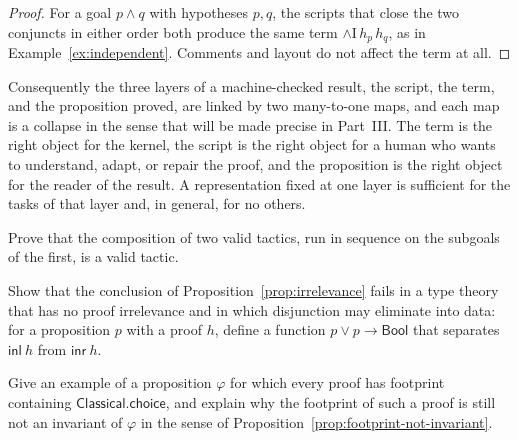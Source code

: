 \begin{proof}
For a goal $p\wedge q$ with hypotheses $p,q$, the scripts that close the two conjuncts in either order both produce the same term $\wedge\mathrm{I}\,h_p\,h_q$, as in Example~\ref{ex:independent}. Comments and layout do not affect the term at all.
\end{proof}

Consequently the three layers of a machine-checked result, the script, the term, and the proposition proved, are linked by two many-to-one maps, and each map is a collapse in the sense that will be made precise in Part~III. The term is the right object for the kernel, the script is the right object for a human who wants to understand, adapt, or repair the proof, and the proposition is the right object for the reader of the result. A representation fixed at one layer is sufficient for the tasks of that layer and, in general, for no others.

\begin{exercise}
Prove that the composition of two valid tactics, run in sequence on the subgoals of the first, is a valid tactic.
\end{exercise}

\begin{exercise}
Show that the conclusion of Proposition~\ref{prop:irrelevance} fails in a type theory that has no proof irrelevance and in which disjunction may eliminate into data: for a proposition $p$ with a proof $h$, define a function $p\vee p\to\mathsf{Bool}$ that separates $\mathsf{inl}\ h$ from $\mathsf{inr}\ h$.
\end{exercise}

\begin{exercise}
Give an example of a proposition $\varphi$ for which every proof has footprint containing $\mathsf{Classical.choice}$, and explain why the footprint of such a proof is still not an invariant of $\varphi$ in the sense of Proposition~\ref{prop:footprint-not-invariant}.
\end{exercise}
